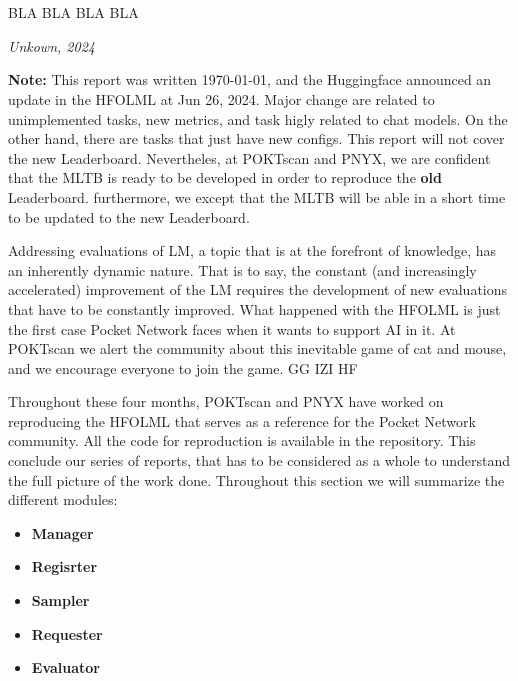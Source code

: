 \section{}\label{sec:b}
\epigraph{BLA BLA BLA BLA}{\textit{Unkown, 2024}}

\begin{tcolorbox}[colback=red!5!white,colframe=red!75!black]
\textbf{Note:} This report was written \today, and the Huggingface announced an update in the \gls{HFOLML} at Jun 26, 2024. 
Major change are related to unimplemented tasks, new metrics, and task higly related to chat models. On the other hand, there are tasks that just have new configs. 
This report will not cover the new Leaderboard. 
Nevertheles, at POKTscan and PNYX, we are confident that the \gls{MLTB} is ready to be developed in order to reproduce the \textbf{old} Leaderboard. 
furthermore, we except that the \gls{MLTB} will be able in a short time to be updated to the new Leaderboard. 

Addressing evaluations of \gls{LM}, a topic that is at the forefront of knowledge, has an inherently dynamic nature. 
That is to say, the constant (and increasingly accelerated) improvement of the \gls{LM} requires the development of new evaluations that have to be constantly improved. 
What happened with the \gls{HFOLML} is just the first case Pocket Network faces when it wants to support AI in it. 
At POKTscan we alert the community about this inevitable game of cat and mouse, and we encourage everyone to join the game. GG IZI HF
\end{tcolorbox}


Throughout these four months, POKTscan and PNYX have worked on reproducing the \gls{HFOLML} \cite{noauthor_open_nodate} that serves as a reference for the Pocket Network community. 
All the code for reproduction is available in the repository. 
This conclude our series of reports, that has to be considered as a whole to understand the full picture of the work done. 
Throughout this section we will summarize the different modules:

\begin{itemize}[noitemsep]
    \item \textbf{Manager}
    \item \textbf{Regisrter}
    \item \textbf{Sampler}
    \item \textbf{Requester}
    \item \textbf{Evaluator}
\end{itemize}


